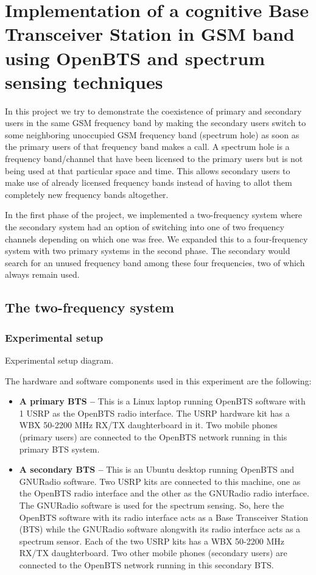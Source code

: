 \chapter{Implementation of a cognitive Base Transceiver Station in GSM band 
using OpenBTS and spectrum sensing techniques}

In this project we try to demonstrate the coexistence of primary and secondary
users in the same GSM frequency band by making the secondary users switch to 
some neighboring unoccupied GSM frequency band (spectrum hole) as soon as the 
primary users of that frequency band makes a call. A spectrum hole is a 
frequency band/channel that have been licensed to the primary users but is not 
being used at that particular space and time. This allows secondary users to 
make use of already licensed frequency bands instead of having to allot them 
completely new frequency bands altogether.

In the first phase of the project, we implemented a two-frequency system where
the secondary system had an option of switching into one of two frequency 
channels depending on which one was free. We expanded this to a four-frequency
system with two primary systems in the second phase. The secondary would 
search for an unused frequency band among these four frequencies, two of which
always remain used.

\section{The two-frequency system}
\subsection{Experimental setup}

Experimental setup diagram.

The hardware and software components used in this experiment are the 
following:
\begin{itemize}
    \item \textbf{A primary BTS --} This is a Linux laptop running OpenBTS
    software with 1 USRP as the OpenBTS radio interface. The USRP hardware kit
    has a WBX 50-2200 MHz RX/TX daughterboard in it. Two mobile phones 
    (primary users) are connected to the OpenBTS network running in this 
    primary BTS system.
    \item \textbf{A secondary BTS --} This is an Ubuntu desktop running
    OpenBTS and GNURadio software. Two USRP kits are connected to this
    machine, one as the OpenBTS radio interface and the other as the GNURadio
    radio interface. The GNURadio software is used for the spectrum sensing. 
    So, here the OpenBTS software with its radio interface acts as a Base
    Transceiver Station (BTS) while the GNURadio software alongwith its radio
    interface acts as a spectrum sensor. Each of the two USRP kits has a
    WBX 50-2200 MHz RX/TX daughterboard. Two other mobile phones (secondary 
    users) are connected to the OpenBTS network running in this secondary BTS.
\end{itemize}

